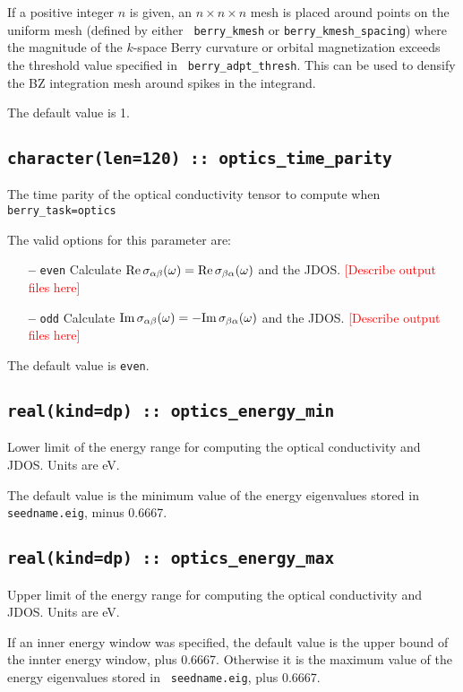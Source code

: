 If a positive integer $n$ is given, an $n\times n\times n$ mesh is
placed around points on the uniform mesh (defined by either {\tt
  berry\_kmesh} or {\tt berry\_kmesh\_spacing}) where
the magnitude of the $k$-space Berry curvature or orbital
magnetization exceeds the threshold value specified in {\tt
  berry\_adpt\_thresh}. This can be used to densify the BZ
integration mesh around spikes in the integrand.

The default value is 1.

\subsection[berry\_spectrum\_time\_parity]{\tt character(len=120) ::  optics\_time\_parity}
The time parity of the optical conductivity tensor to compute when
{\tt berry\_task=optics}

The valid options for this parameter are:
\begin{itemize}
\item[{\bf --}]  \verb#even# Calculate ${\rm Re}\,\sigma_{\alpha\beta}(\omega)={\rm Re}\,\sigma_{\beta\alpha}(\omega)$ and the JDOS. \textcolor{red}{[Describe output files here]}
\item[{\bf --}]  \verb#odd#  Calculate ${\rm Im}\,\sigma_{\alpha\beta}(\omega)=-{\rm Im}\,\sigma_{\beta\alpha}(\omega)$  and the JDOS. \textcolor{red}{[Describe output files here]}
\end{itemize}

The default value is {\tt even}.


\subsection[optics\_energy\_min]{\tt real(kind=dp) :: optics\_energy\_min}
Lower limit of the energy range for computing the optical conductivity
and JDOS.  Units are eV.

The default value is the minimum value of the energy eigenvalues
stored in {\tt seedname.eig}, minus 0.6667.

\subsection[optics\_energy\_max]{\tt real(kind=dp) :: optics\_energy\_max}
Upper limit of the energy range for computing the optical conductivity
and JDOS.  Units are eV.

If an inner energy window was specified, the default value is the
upper bound of the innter energy window, plus 0.6667.  Otherwise it is
the maximum value of the energy eigenvalues stored in {\tt
  seedname.eig}, plus 0.6667.


